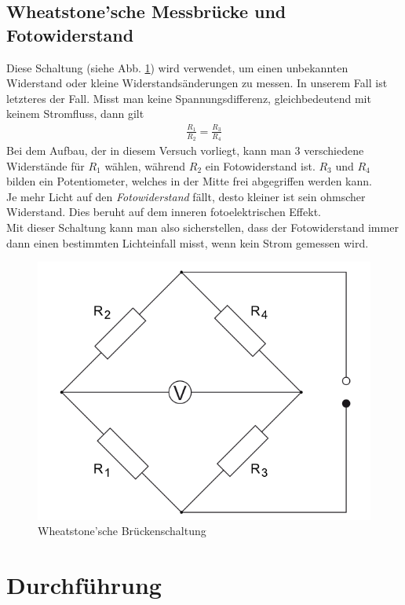 \documentclass[12pt,a4paper,titlepage,headinclude,bibtotoc]{scrartcl}
\begin{document}
\subsection{Wheatstone'sche Messbrücke und Fotowiderstand}
Diese Schaltung (siehe Abb. \ref{fig:bruecke})  wird verwendet, um einen unbekannten Widerstand  oder kleine Widerstandsänderungen zu messen.
In unserem Fall ist letzteres der Fall.
Misst man keine Spannungsdifferenz, gleichbedeutend mit keinem Stromfluss, dann gilt
\begin{align*}
	\frac{R_1}{R_2}=\frac{R_3}{R_4}
\end{align*}
Bei dem Aufbau, der in diesem Versuch vorliegt, kann man 3 verschiedene Widerstände für $R_1$ wählen, während $R_2$ ein Fotowiderstand ist.
$R_3$ und $R_4$ bilden ein Potentiometer, welches in der Mitte frei abgegriffen werden kann.\\
Je mehr Licht auf den \textit{Fotowiderstand} fällt, desto kleiner ist sein ohmscher Widerstand.
Dies beruht auf dem inneren fotoelektrischen Effekt.\\
Mit dieser Schaltung kann man also sicherstellen, dass der Fotowiderstand immer dann einen bestimmten Lichteinfall misst, wenn kein Strom gemessen wird.

\begin{figure}[!htb]
	\centering	
	\includegraphics[scale=0.7]{Brueckenschaltung.png}
	\caption{Wheatstone'sche Brückenschaltung \cite{lp}}
	\label{fig:bruecke}
\end{figure}


\section{Durchführung}
\label{sec:durchfuehrung}
\end{document}
